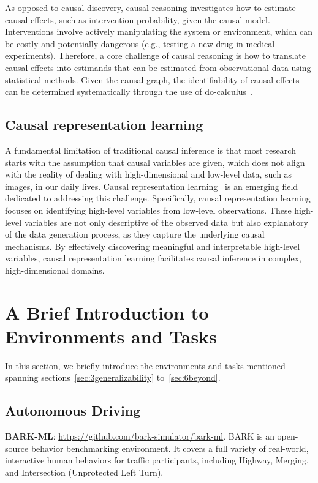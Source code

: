 \documentclass[10pt]{article} %
\theoremstyle{definition}
\begin{document}
As opposed to causal discovery, causal reasoning investigates how to estimate causal effects, such as intervention probability, given the causal model. Interventions involve actively manipulating the system or environment, which can be costly and potentially dangerous (e.g., testing a new drug in medical experiments). Therefore, a core challenge of causal reasoning is how to translate causal effects into estimands that can be estimated from observational data using statistical methods. Given the causal graph, the identifiability of causal effects can be determined systematically through the use of do-calculus~\citep{pearlCausalDiagramsEmpirical1995}.

\subsection{Causal representation learning}
A fundamental limitation of traditional causal inference is that most research starts with the assumption that causal variables are given, which does not align with the reality of dealing with high-dimensional and low-level data, such as images, in our daily lives. Causal representation learning~\citep{scholkopfCausalRepresentationLearning2021a} is an emerging field dedicated to addressing this challenge. Specifically, causal representation learning focuses on identifying high-level variables from low-level observations. These high-level variables are not only descriptive of the observed data but also explanatory of the data generation process, as they capture the underlying causal mechanisms. By effectively discovering meaningful and interpretable high-level variables, causal representation learning facilitates causal inference in complex, high-dimensional domains.

\section{A Brief Introduction to Environments and Tasks}
\label{app:env}
In this section, we briefly introduce the environments and tasks mentioned spanning sections~\ref{sec:3generalizability} to~\ref{sec:6beyond}.
\subsection{Autonomous Driving}
\textbf{BARK-ML}: \url{https://github.com/bark-simulator/bark-ml}. BARK is an open-source behavior benchmarking environment. It covers a full variety of real-world, interactive human behaviors for traffic participants, including Highway, Merging, and Intersection (Unprotected Left Turn). 
\end{document}
